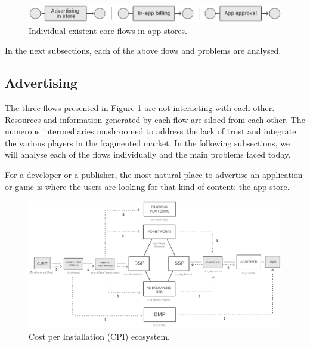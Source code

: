 \begin{figure}[!ht]
\centering
\includegraphics[width=\textwidth]{diagrams/current_flows.eps}
\caption{Individual existent core flows in app stores.}
\label{fig:exist_flows}
\end{figure}


In the next subsections, each of the above flows and problems are analysed.

\subsection{Advertising}
\label{subsec:intro_ads}


The three flows presented in Figure \ref{fig:exist_flows} are not interacting with each other. Resources and information generated by each flow are siloed from each other. The numerous intermediaries mushroomed to address the lack of trust and integrate the various players in the fragmented market. In the following subsections, we will analyse each of the flows individually and the main problems faced today.


\medskip

For a developer or a publisher, the most natural place to advertise an application or game is where the users are looking for that kind of content: the app store.

\begin{figure}[!ht]
\centering
\includegraphics[width=\textwidth]{diagrams/cpi_flow.eps}
\caption{Cost per Installation (CPI) ecosystem.}
\label{fig:cpi}
\end{figure}

